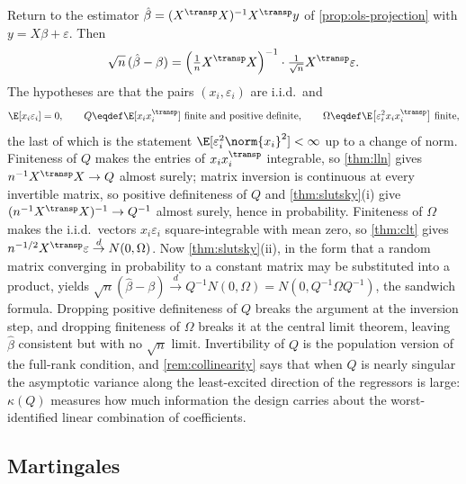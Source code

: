 \begin{remark}\label{rem:ols-asymptotics}
	Return to the estimator $\hat\beta=(X^{\transp}X)^{-1}X^{\transp}y$ of
	\autoref{prop:ols-projection} with $y=X\beta+\varepsilon$. Then
	\[
		\sqrt n\,(\hat\beta-\beta)
		=\Bigl(\tfrac1nX^{\transp}X\Bigr)^{-1}\cdot
		\tfrac{1}{\sqrt n}X^{\transp}\varepsilon .
	\]
	The hypotheses are that the pairs $(x_i,\varepsilon_i)$ are i.i.d.\ and
	\begin{equation}\label{eq:ols-asy-assumptions}
		\E[x_i\varepsilon_i]=0,\qquad
		Q\eqdef\E[x_ix_i^{\transp}]\ \text{finite and positive definite},\qquad
		\Omega\eqdef\E\bigl[\varepsilon_i^{2}x_ix_i^{\transp}\bigr]\ \text{finite},
	\end{equation}
	the last of which is the statement $\E[\varepsilon_i^{2}\norm{x_i}^{2}]<\infty$
	up to a change of norm. Finiteness of $Q$ makes the entries of
	$x_ix_i^{\transp}$ integrable, so \autoref{thm:lln} gives
	$n^{-1}X^{\transp}X\to Q$ almost surely; matrix inversion is continuous at
	every invertible matrix, so positive definiteness of $Q$ and
	\autoref{thm:slutsky}(i) give
	$(n^{-1}X^{\transp}X)^{-1}\to Q^{-1}$ almost surely, hence in probability.
	Finiteness of $\Omega$ makes the i.i.d.\ vectors $x_i\varepsilon_i$
	square-integrable with mean zero, so \autoref{thm:clt} gives
	$n^{-1/2}X^{\transp}\varepsilon\overset{d}{\to}N(0,\Omega)$. Now
	\autoref{thm:slutsky}(ii), in the form that a random matrix converging in
	probability to a constant matrix may be substituted into a product, yields
	$\sqrt n(\hat\beta-\beta)\overset{d}{\to}Q^{-1}N(0,\Omega)
		=N(0,Q^{-1}\Omega Q^{-1})$, the sandwich formula. Dropping positive
	definiteness of $Q$ breaks the argument at the inversion step, and dropping
	finiteness of $\Omega$ breaks it at the central limit theorem, leaving
	$\hat\beta$ consistent but with no $\sqrt n$ limit. Invertibility of $Q$ is
	the population version of the
	full-rank condition, and \autoref{rem:collinearity} says that when $Q$ is nearly
	singular the asymptotic variance along the least-excited direction of the
	regressors is large: $\kappa(Q)$ measures how much information the design
	carries about the worst-identified linear combination of coefficients.
\end{remark}

\subsection{Martingales}\label{subsec:prob-martingales}

